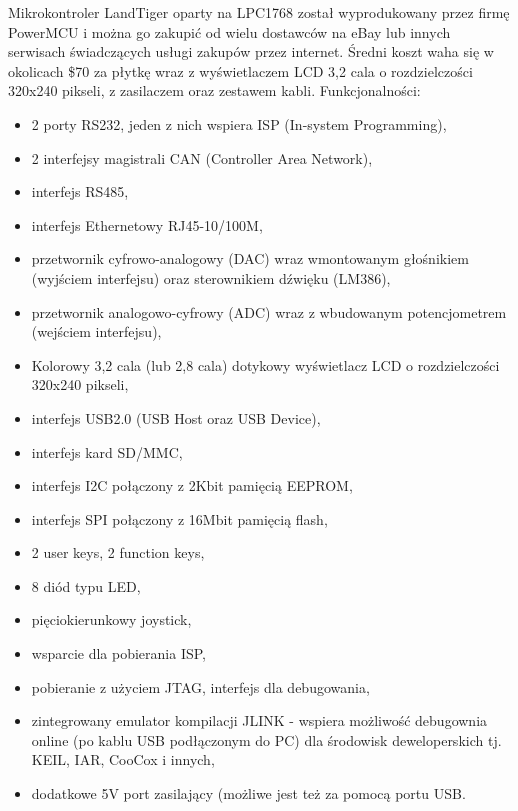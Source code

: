 \documentclass{BscUS}
\begin{document}
Mikrokontroler LandTiger oparty na LPC1768 został wyprodukowany przez firmę PowerMCU i można go zakupić od wielu dostawców na eBay lub innych serwisach świadczących usługi zakupów przez internet. Średni koszt waha się w okolicach \$70 za płytkę wraz z wyświetlaczem LCD 3,2 cala o rozdzielczości 320x240 pikseli, z zasilaczem oraz zestawem kabli. \cite{landtigerDesc}
\newline
Funkcjonalności:
\begin{itemize} %
\item 2 porty RS232, jeden z nich wspiera ISP (In-system Programming),
\item 2 interfejsy magistrali CAN (Controller Area Network),
\item interfejs RS485,
\item interfejs Ethernetowy RJ45-10/100M,
\item przetwornik cyfrowo-analogowy (DAC) wraz wmontowanym głośnikiem (wyjściem interfejsu) oraz sterownikiem dźwięku (LM386),
\item przetwornik analogowo-cyfrowy (ADC) wraz z wbudowanym potencjometrem (wejściem interfejsu),
\item Kolorowy 3,2 cala (lub 2,8 cala) dotykowy wyświetlacz LCD o rozdzielczości 320x240 pikseli,
\item interfejs USB2.0 (USB Host oraz USB Device),
\item interfejs kard SD/MMC,
\item interfejs I2C połączony z 2Kbit pamięcią EEPROM,
\item interfejs SPI połączony z 16Mbit pamięcią flash,
\item 2 user keys, 2 function keys,
\item 8 diód typu LED,
\item pięciokierunkowy joystick,
\item wsparcie dla pobierania ISP,
\item pobieranie z użyciem JTAG, interfejs dla debugowania,
\item zintegrowany emulator kompilacji JLINK - wspiera możliwość debugownia online (po kablu USB podłączonym do PC) dla środowisk deweloperskich tj. KEIL, IAR, CooCox i innych,
\item dodatkowe 5V port zasilający (możliwe jest też za pomocą portu USB.
\end{itemize}
\end{document}
